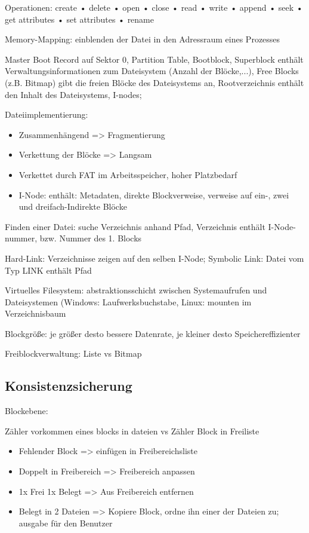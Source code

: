 Operationen:
create
• delete
• open
• close
• read
• write
• append
• seek
• get attributes
• set attributes
• rename

Memory-Mapping: einblenden der Datei in den Adressraum eines Prozesses


Master Boot Record auf Sektor 0, Partition Table, Bootblock, Superblock enthält Verwaltungsinformationen zum
Dateisystem (Anzahl der Blöcke,...), Free Blocks (z.B. Bitmap) gibt die freien Blöcke des
Dateisystems an, Rootverzeichnis enthält den Inhalt des Dateisystems, I-nodes;

Dateiimplementierung:
\begin{itemize}
\item Zusammenhängend => Fragmentierung
\item Verkettung der Blöcke => Langsam
\item Verkettet durch FAT im Arbeitsspeicher, hoher Platzbedarf
\item I-Node: enthält: Metadaten, direkte Blockverweise, verweise auf ein-, zwei und dreifach-Indirekte Blöcke
\end{itemize}

Finden einer Datei: suche Verzeichnis anhand Pfad, Verzeichnis enthält I-Node-nummer, bzw. Nummer des 1. Blocks

Hard-Link: Verzeichnisse zeigen auf den selben I-Node;
Symbolic Link: Datei vom Typ LINK enthält Pfad

Virtuelles Filesystem: abstraktionsschicht zwischen Systemaufrufen und Dateisystemen (Windows: Laufwerksbuchstabe, Linux: mounten im Verzeichnisbaum

Blockgröße: je größer desto bessere Datenrate, je kleiner desto Speichereffizienter

Freiblockverwaltung: Liste vs Bitmap

\subsection*{Konsistenzsicherung}
Blockebene:

Zähler vorkommen eines blocks in dateien vs Zähler Block in Freiliste
\begin{itemize}
\item Fehlender Block => einfügen in Freibereichsliste
\item Doppelt in Freibereich => Freibereich anpassen
\item 1x Frei 1x Belegt => Aus Freibereich entfernen
\item Belegt in 2 Dateien => Kopiere Block, ordne ihn einer der Dateien zu; ausgabe für den Benutzer
\end{itemize}

